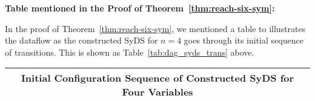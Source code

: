 \medskip

\noindent
\textbf{Table mentioned in the Proof of Theorem~\ref{thm:reach-six-sym}:}

\medskip

In the proof of Theorem~\ref{thm:reach-six-sym}, we mentioned a table
to illustrates the dataflow as the constructed SyDS \cals{}  
for $n =4$ goes through its initial sequence of transitions.
This is shown as Table~\ref{tab:dag_syds_trans} above.

\bigskip

\begin{table*}
\begin{center}
\begin{tabular}{|l | c c c c c c c c c c c |} \hline
\multicolumn{12}{|c|}{{\bf Initial Configuration Sequence of 
Constructed SyDS for Four Variables}}\\ \hline


\end{tabular}
\end{center}
\end{table*}
